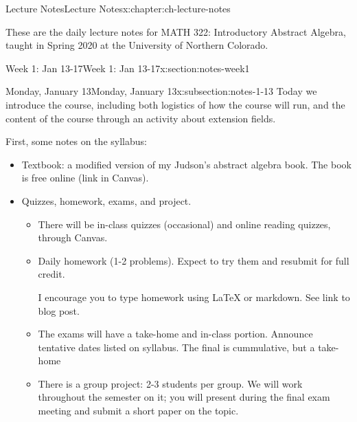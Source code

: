\documentclass[oneside,11pt,]{book}
\begin{document}
%
%
\typeout{************************************************}
\typeout{************************************************}
%
\begin{chapterptx}{Lecture Notes}{}{Lecture Notes}{}{}{x:chapter:ch-lecture-notes}
\begin{introduction}{}%
These are the daily lecture notes for MATH 322: Introductory Abstract Algebra, taught in Spring 2020 at the University of Northern Colorado.%
\end{introduction}%
%
%
\typeout{************************************************}
\typeout{************************************************}
%
\begin{sectionptx}{Week 1: Jan 13-17}{}{Week 1: Jan 13-17}{}{}{x:section:notes-week1}
%
%
\typeout{************************************************}
\typeout{************************************************}
%
\begin{subsectionptx}{Monday, January 13}{}{Monday, January 13}{}{}{x:subsection:notes-1-13}
Today we introduce the course, including both logistics of how the course will run, and the content of the course through an activity about extension fields.%
\par
First, some notes on the syllabus:%
\begin{itemize}[label=\textbullet]
\item{}Textbook: a modified version of my Judson's abstract algebra book.  The book is free online (link in Canvas).%
\item{}Quizzes, homework, exams, and project.%
\begin{itemize}[label=$\circ$]
\item{}There will be in-class quizzes (occasional) and online reading quizzes, through Canvas.%
\item{}Daily homework (1-2 problems).  Expect to try them and resubmit for full credit.%
\par
I encourage you to type homework using LaTeX or markdown.  See link to blog post.%
\item{}The exams will have a take-home and in-class portion.  Announce tentative dates listed on syllabus.  The final is cummulative, but a take-home%
\item{}There is a group project: 2-3 students per group.  We will work throughout the semester on it; you will present during the final exam meeting and submit a short paper on the topic.%
\end{itemize}

\end{itemize}
\end{subsectionptx}
\end{sectionptx}
\end{chapterptx}
\end{document}
